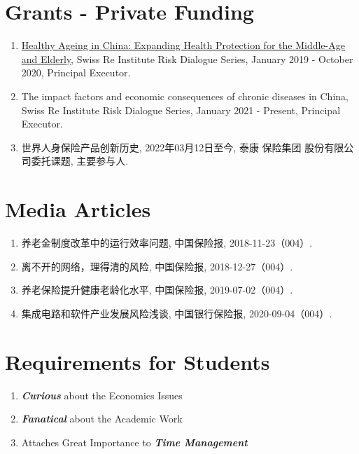 \documentclass[a4paper,20pt]{article}
\begin{document}
\vspace{-5pt}
\section{Grants - Private Funding}
\begin{enumerate}
  \item \href{https://www.swissre.com/institute/dam/jcr:b40ed819-5639-412f-b56b-c230e92464f5/healthy-ageing-in-china.pdf}{Healthy Ageing in China: Expanding Health Protection for the Middle-Age and Elderly}, Swiss Re Institute Risk Dialogue Series, January 2019 - October 2020, Principal Executor.
  \item The impact factors and economic consequences of chronic diseases in China, Swiss Re Institute Risk Dialogue Series, January 2021 - Present, Principal Executor.
  \item 世界人身保险产品创新历史, 2022年03月12日至今, 泰康 保险集团 股份有限公司委托课题, 主要参与人.
\end{enumerate}

\vspace{-5pt}
\section{Media Articles}
\begin{enumerate}
  \item 养老金制度改革中的运行效率问题, 中国保险报, 2018-11-23（004）.
  \item 离不开的网络，理得清的风险, 中国保险报, 2018-12-27（004）.
  \item 养老保险提升健康老龄化水平, 中国保险报, 2019-07-02（004）.
  \item 集成电路和软件产业发展风险浅谈, 中国银行保险报, 2020-09-04（004）.
\end{enumerate}

\vspace{-5pt}
\section{Requirements for Students}
\begin{enumerate}
  \item \emph{\textbf{Curious}} about the Economics Issues
  \item \textbf{\emph{Fanatical}} about the Academic Work
  \item Attaches Great Importance to \emph{\textbf{Time Management}}
\end{enumerate}

\end{document}
